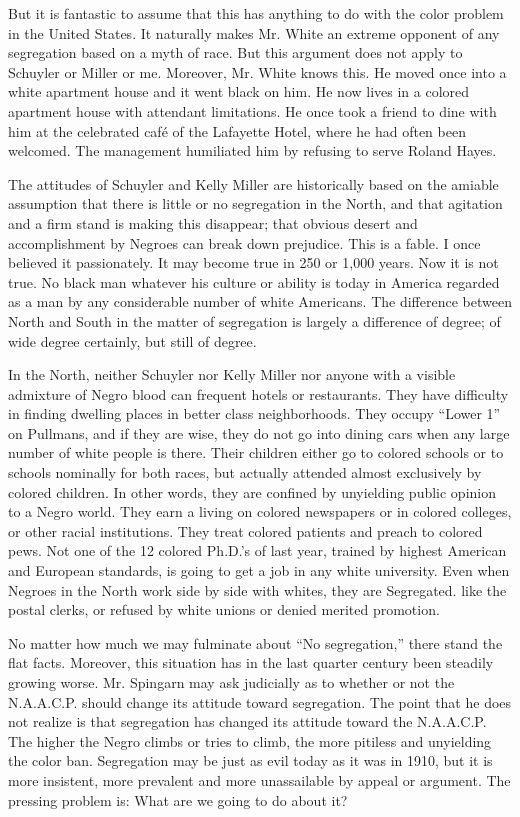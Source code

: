 \documentclass[letterpaper,10pt,english]{jupyterBook}
\begin{document}
\sphinxAtStartPar
But it is fantastic to assume that this has anything to do with the color problem in the United States. It naturally makes Mr. White an extreme opponent of any segregation based on a myth of race. But this argument does not apply to Schuyler or Miller or me. Moreover, Mr. White knows this. He moved once into a white apartment house and it went black on him. He now lives in a colored apartment house with attendant limitations. He once took a friend to dine with him at the celebrated café of the Lafayette Hotel, where he had often been welcomed. The management humiliated him by refusing to serve Roland Hayes.

\sphinxAtStartPar
The attitudes of Schuyler and Kelly Miller are historically based on the amiable assumption that there is little or no segregation in the North, and that agitation and a firm stand is making this disappear; that obvious desert and accomplishment by Negroes can break down prejudice. This is a fable. I once believed it passionately. It may become true in 250 or 1,000 years. Now it is not true. No black man whatever his culture or ability is today in America regarded as a man by any considerable number of white Americans. The difference between North and South in the matter of segregation is largely a difference of degree; of wide degree certainly, but still of degree.

\sphinxAtStartPar
In the North, neither Schuyler nor Kelly Miller nor anyone with a visible admixture of Negro blood can frequent hotels or restaurants. They have difficulty in finding dwelling places in better class neighborhoods. They occupy “Lower 1” on Pullmans, and if they are wise, they do not go into dining cars when any large number of white people is there. Their children either go to colored schools or to schools nominally for both races, but actually attended almost exclusively by colored children. In other words, they are confined by unyielding public opinion to a Negro world. They earn a living on colored newspapers or in colored colleges, or other racial institutions. They treat colored patients and preach to colored pews. Not one of the 12 colored Ph.D.’s of last year, trained by highest American and European standards, is going to get a job in any white university. Even when Negroes in the North work side by side with whites, they are Segregated. like the postal clerks, or refused by white unions or denied merited promotion.

\sphinxAtStartPar
No matter how much we may fulminate about “No segregation,” there stand the flat facts. Moreover, this situation has in the last quarter century been steadily growing worse. Mr. Spingarn may ask judicially as to whether or not the N.A.A.C.P. should change its attitude toward segregation. The point that he does not realize is that segregation has changed its attitude toward the N.A.A.C.P. The higher the Negro climbs or tries to climb, the more pitiless and unyielding the color ban. Segregation may be just as evil today as it was in 1910, but it is more insistent, more prevalent and more unassailable by appeal or argument. The pressing problem is: What are we going to do about it?
\end{document}
